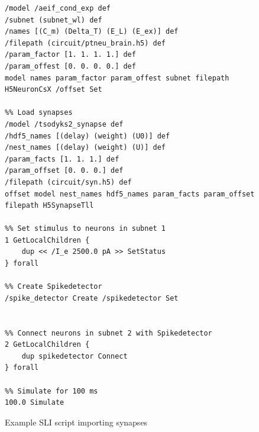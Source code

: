 \newpage
\begin{figure}[ht!]
\begin{lstlisting}[]
%% Load neurons
/model /aeif_cond_exp def
/subnet (subnet_wl) def
/names [(C_m) (Delta_T) (E_L) (E_ex)] def
/filepath (circuit/ptneu_brain.h5) def
/param_factor [1. 1. 1. 1.] def
/param_offest [0. 0. 0. 0.] def
model names param_factor param_offest subnet filepath H5NeuronCsX /offset Set

%% Load synapses
/model /tsodyks2_synapse def
/hdf5_names [(delay) (weight) (U0)] def
/nest_names [(delay) (weight) (U)] def
/param_facts [1. 1. 1.] def
/param_offset [0. 0. 0.] def
/filepath (circuit/syn.h5) def
offset model nest_names hdf5_names param_facts param_offset filepath H5SynapseTll

%% Set stimulus to neurons in subnet 1
1 GetLocalChildren { 
    dup << /I_e 2500.0 pA >> SetStatus
} forall

%% Create Spikedetector
/spike_detector Create /spikedetector Set


%% Connect neurons in subnet 2 with Spikedetector
2 GetLocalChildren { 
    dup spikedetector Connect
} forall

%% Simulate for 100 ms
100.0 Simulate
\end{lstlisting}
\caption{Example SLI script importing synapses}
\label{fig:exa:nestimport}
\end{figure}

